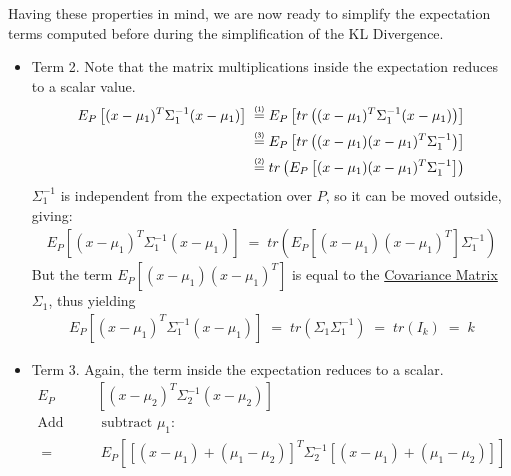 \documentclass[12pt]{report}
\newcommand\prone{\mathrel{\overset{\makebox[0pt]{\mbox{\normalfont\tiny\sffamily (1)}}}{=}}}
\newcommand\prtwo{\mathrel{\overset{\makebox[0pt]{\mbox{\normalfont\tiny\sffamily (2)}}}{=}}}
\newcommand\prthr{\mathrel{\overset{\makebox[0pt]{\mbox{\normalfont\tiny\sffamily (3)}}}{=}}}
\begin{document}
\noindent Having these properties in mind, we are now ready to simplify the
expectation terms computed before during the simplification of the KL Divergence.

\begin{itemize}
    \item Term 2. Note that the matrix multiplications inside the expectation reduces
        to a scalar value.
        \begin{align*}
            E_P \left[ (x-\mu_1)^T\Sigma_1^{-1} (x - \mu_1) \right]
            \;\prone\;& E_P \left[ tr\left((x-\mu_1)^T\Sigma_1^{-1}
                (x - \mu_1)\right) \right] \\
            \;\prthr\;& E_P \left[ tr\left( (x - \mu_1)(x - \mu_1)^T
                \Sigma_1^{-1} \right) \right] \\
            \;\prtwo\;& tr\left( E_P\left[ (x - \mu_1)(x - \mu_1)^T
                \Sigma_1^{-1} \right] \right)
        \end{align*}
        $\Sigma_1^{-1}$ is independent from the expectation over $P$, so it can be moved
        outside, giving:
        \begin{align*}
            E_P \left[ (x-\mu_1)^T\Sigma_1^{-1} (x - \mu_1) \right] \;=\;
                tr\left( E_P\left[ (x - \mu_1)(x - \mu_1)^T
                    \right] \Sigma_1^{-1} \right)
        \end{align*}
        But the term $E_P\left[ (x - \mu_1)(x - \mu_1)^T \right]$ is equal to the
        \href{https://en.wikipedia.org/wiki/Covariance_matrix#Definition}
        {Covariance Matrix} $\Sigma_1$, thus yielding
        \begin{align}\label{eq:kld_term2}
            E_P \left[ (x-\mu_1)^T\Sigma_1^{-1} (x - \mu_1) \right]
                \;=\; tr\left( \Sigma_1 \Sigma_1^{-1} \right) \;=\; tr(I_k) \;=\; k
        \end{align}
    \item Term 3. Again, the term inside the expectation reduces to a scalar.
        \begin{align*}
            E_P &\left[ (x - \mu_2)^T\Sigma_2^{-1} (x - \mu_2) \right] \\[1ex]
            \mbox{Add and}& \mbox{ subtract } \mu_1: \\[1ex]
            \;=&\; E_P \left[ [(x - \mu_1) + (\mu_1 - \mu_2)]^T\Sigma_2^{-1}
                [(x - \mu_1) + (\mu_1 - \mu_2)] \right] \\[2ex]

\end{align*}
\end{itemize}
\end{document}
